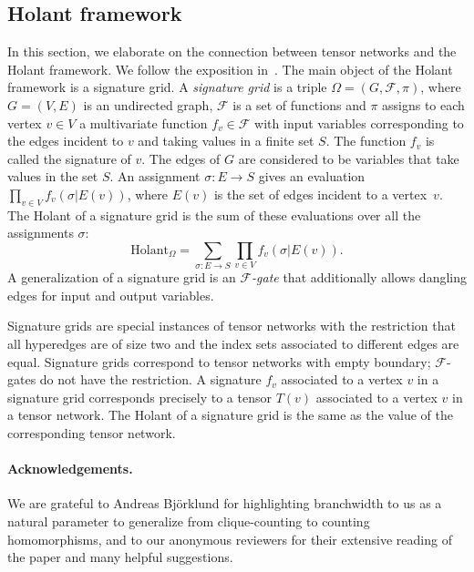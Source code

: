 \subsection{Holant framework} \label{sec:Holant_theory}

In this section, we elaborate on the connection between tensor networks and the Holant framework. We follow the exposition in~\cite{CaiLX2011}. The main object of the Holant framework is a signature grid. A \emph{signature grid} is a triple $\Omega = (G,\mathcal{F},\pi)$, where $G=(V,E)$ is an undirected graph, $\mathcal{F}$ is a set of functions and $\pi$ assigns to each vertex $v \in V$ a multivariate function $f_v \in \mathcal{F}$ with input variables corresponding to the edges incident to $v$ and taking values in a finite set $S$. The function $f_v$ is called the signature of $v$. The edges of $G$ are considered to be variables that take values in the set $S$. An assignment $\sigma : E \rightarrow S$ gives an evaluation $\prod_{v \in V} f_v(\sigma|E(v))$, where $E(v)$ is the set of edges incident to a vertex~$v$. The Holant of a signature grid is the sum of these evaluations over all the assignments $\sigma$:
$$
\text{Holant}_{\Omega}=\sum_{\sigma:E \rightarrow S} \prod_{v \in V} f_v(\sigma|E(v)).
$$
A generalization of a signature grid is an \emph{$\mathcal{F}$-gate} that additionally allows dangling edges for input and output variables.

Signature grids are special instances of tensor networks with the restriction that all hyperedges are of size two and the index sets associated to different edges are equal. Signature grids correspond to tensor networks with empty boundary; $\mathcal{F}$-gates do not have the restriction. A signature $f_v$ associated to a vertex $v$ in a signature grid corresponds precisely to a tensor $T(v)$ associated to a vertex $v$ in a tensor network.  The Holant of a signature grid is the same as the value of the corresponding tensor network.


\paragraph{Acknowledgements.}  We are grateful to Andreas Bj\"orklund for highlighting branchwidth
to us as a natural parameter to generalize from clique-counting to counting
homomorphisms, and to our anonymous reviewers for their extensive reading of the paper and many helpful suggestions.
